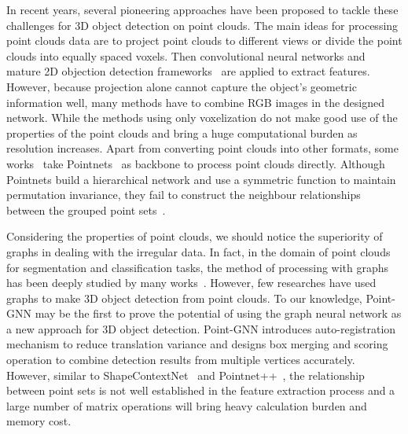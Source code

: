 \documentclass{article}
\begin{document}
In recent years, several pioneering approaches have been proposed to tackle these challenges for 3D object detection on point clouds. The main ideas for processing point clouds data are to project point clouds to different views\cite{simon2019complexer,chen2017multi,ku2018joint,liang2018deep,yang2018hdnet,yang2018pixor} or divide the point clouds into equally spaced voxels\cite{li20173d,engelcke2017vote3deep,zhou2018voxelnet,yan2018second}. Then convolutional neural networks and mature 2D objection detection frameworks~\cite{ren2015faster,redmon2016you} are applied to extract features. However, because projection alone cannot capture the object's geometric information well, many methods\cite{chen2017multi,wang2019frustum,qi2018frustum,8794195} have to combine RGB images in the designed network. While the methods using only voxelization do not make good use of the properties of the point clouds and bring a huge computational burden\cite{liu2019point} as resolution increases. Apart from converting point clouds into other formats, some works~\cite{shi2019pointrcnn,yang2019std} take Pointnets~\cite{qi2017pointnet,qi2017pointnet++} as backbone to process point clouds directly. Although Pointnets build a hierarchical network and use a symmetric function to maintain permutation invariance, they fail to construct the neighbour relationships between the grouped point sets~\cite{Wang:2019:DGC:3341165.3326362}.

Considering the properties of point clouds, we should notice the superiority of graphs in dealing with the irregular data. In fact, in the domain of point clouds for segmentation and classification tasks, the method of processing with graphs has been deeply studied by many works~\cite{8237818,9010397,Landrieu2018Large,8578576,Wang:2019:DGC:3341165.3326362}. However, few researches have used graphs to make 3D object detection from point clouds. To our knowledge, Point-GNN\cite{Point-GNN} may be the first to prove the potential of using the graph neural network as a new approach for 3D object detection. Point-GNN introduces auto-registration mechanism to reduce translation variance and designs box merging and scoring operation to combine detection results from multiple vertices accurately. However, similar to ShapeContextNet~\cite{8578582} and Pointnet++~\cite{qi2017pointnet++}, the relationship between point sets is not well established in the feature extraction process and a large number of matrix operations will bring heavy calculation burden and memory cost.
\end{document}
